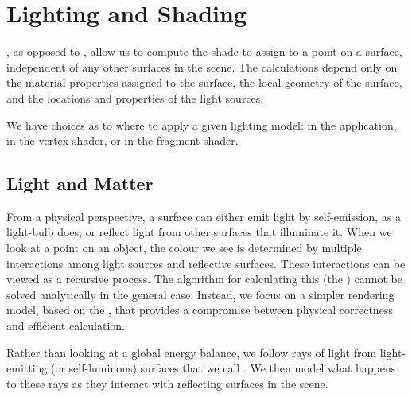 \documentclass[../COS3712_Notes.tex]{subfiles}
\begin{document}
  \setcounter{chapter}{4}
  \chapter{Lighting and Shading}
    , as opposed to ,
    allow us to compute the shade to assign to a point on a surface,
    independent of any other surfaces in the scene.
    The calculations depend only on the material properties assigned to the surface,
    the local geometry of the surface, and the locations and properties of the light sources.

    We have choices as to where to apply a given lighting model:
    in the application, in the vertex shader, or in the fragment shader.

    \section{Light and Matter}
      From a physical perspective, a surface can either emit light by self-emission,
      as a light-bulb does,
      or reflect light from other surfaces that illuminate it.
      When we look at a point on an object, the colour we see is determined by multiple
      interactions among light sources and reflective surfaces.
      These interactions can be viewed as a recursive process.
      The algorithm for calculating this (the ) cannot be solved
      analytically in the general case.
      Instead, we focus on a simpler rendering model, based on the ,
      that provides a compromise between physical correctness and efficient calculation.

      Rather than looking at a global energy balance, we follow rays of light
      from light-emitting (or self-luminous) surfaces that we call .
      We then model what happens to these rays as they interact with reflecting surfaces
      in the scene.
\end{document}
